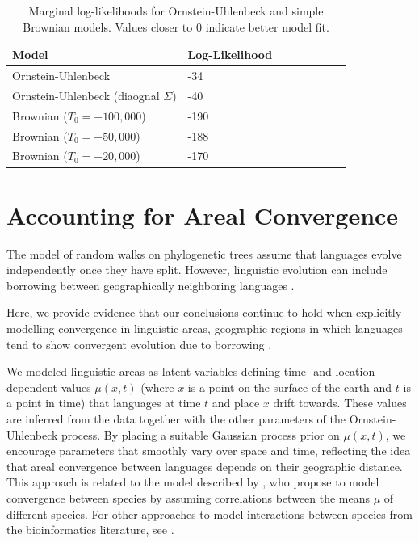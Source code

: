 \documentclass[11pt,a4paper]{article}
\begin{document}
\begin{table}
	\begin{center}
	\begin{tabular}{llllllll}
	Model & Log-Likelihood \\ \hline
	Ornstein-Uhlenbeck & -34 \\
	Ornstein-Uhlenbeck (diaognal $\Sigma$) & -40 \\
	Brownian ($T_0 = -100,000$) & -190 \\
	Brownian ($T_0 = -50,000$) & -188 \\
	Brownian ($T_0 = -20,000$) & -170
\end{tabular}
	\end{center}
	\caption{Marginal log-likelihoods for Ornstein-Uhlenbeck and simple Brownian models. Values closer to $0$ indicate better model fit.}
	\label{tab:marg-brown}
\end{table}

\section{Accounting for Areal Convergence}
The model of random walks on phylogenetic trees assume that languages evolve independently once they have split.
However, linguistic evolution can include borrowing between geographically neighboring languages \citep[e.g.][]{dryer1989large, bisang1996areal, heine2003on, aikhenvald2007grammars,  kalyan2019problems}.

Here, we provide evidence that our conclusions continue to hold when explicitly modelling convergence in linguistic areas, geographic regions in which languages tend to show convergent evolution due to borrowing  \citep[e.g.][]{campbell1986meso, nichols1992linguistic, haspelmath2001the, gijn2017linguistic}.

We modeled linguistic areas as latent variables defining time- and location-dependent values $\mu(x,t)$ (where $x$ is a point on the surface of the earth and $t$ is a point in time) that languages at time $t$ and place $x$ drift towards.
These values are inferred from the data together with the other parameters of the Ornstein-Uhlenbeck process.
By placing a suitable Gaussian process prior on $\mu(x,t)$, we encourage parameters that smoothly vary over space and time, reflecting the idea that areal convergence between languages depends on their geographic distance.
This approach is related to the model described by \citep{nuismer2015predicting}, who propose to model convergence between species by assuming correlations between the means $\mu$ of different species.
For other approaches to model interactions between species from the bioinformatics literature, see \citet{manceau2016a,drury2016estimating, bartoszek2017using, drury2018an}.
\end{document}
